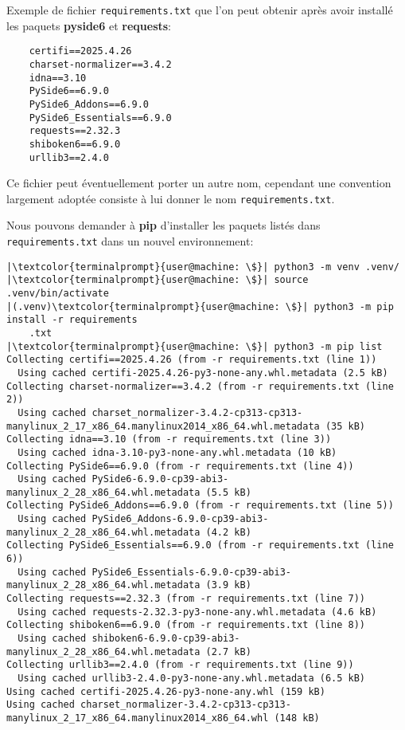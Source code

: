 Exemple de fichier \texttt{requirements.txt} que l'on peut obtenir après avoir installé les paquets \textbf{pyside6} et \textbf{requests}:
\begin{verbatim}
    certifi==2025.4.26
    charset-normalizer==3.4.2
    idna==3.10
    PySide6==6.9.0
    PySide6_Addons==6.9.0
    PySide6_Essentials==6.9.0
    requests==2.32.3
    shiboken6==6.9.0
    urllib3==2.4.0
\end{verbatim}

Ce fichier peut éventuellement porter un autre nom, cependant une convention largement adoptée consiste à lui donner le nom \texttt{requirements.txt}.

Nous pouvons demander à \textbf{pip} d’installer les paquets listés dans \texttt{requirements.txt} dans un nouvel environnement:
\begin{lstlisting}[style=terminal]
|\textcolor{terminalprompt}{user@machine: \$}| python3 -m venv .venv/
|\textcolor{terminalprompt}{user@machine: \$}| source .venv/bin/activate
|(.venv)\textcolor{terminalprompt}{user@machine: \$}| python3 -m pip install -r requirements
    .txt
|\textcolor{terminalprompt}{user@machine: \$}| python3 -m pip list
Collecting certifi==2025.4.26 (from -r requirements.txt (line 1))
  Using cached certifi-2025.4.26-py3-none-any.whl.metadata (2.5 kB)
Collecting charset-normalizer==3.4.2 (from -r requirements.txt (line 2))
  Using cached charset_normalizer-3.4.2-cp313-cp313-manylinux_2_17_x86_64.manylinux2014_x86_64.whl.metadata (35 kB)
Collecting idna==3.10 (from -r requirements.txt (line 3))
  Using cached idna-3.10-py3-none-any.whl.metadata (10 kB)
Collecting PySide6==6.9.0 (from -r requirements.txt (line 4))
  Using cached PySide6-6.9.0-cp39-abi3-manylinux_2_28_x86_64.whl.metadata (5.5 kB)
Collecting PySide6_Addons==6.9.0 (from -r requirements.txt (line 5))
  Using cached PySide6_Addons-6.9.0-cp39-abi3-manylinux_2_28_x86_64.whl.metadata (4.2 kB)
Collecting PySide6_Essentials==6.9.0 (from -r requirements.txt (line 6))
  Using cached PySide6_Essentials-6.9.0-cp39-abi3-manylinux_2_28_x86_64.whl.metadata (3.9 kB)
Collecting requests==2.32.3 (from -r requirements.txt (line 7))
  Using cached requests-2.32.3-py3-none-any.whl.metadata (4.6 kB)
Collecting shiboken6==6.9.0 (from -r requirements.txt (line 8))
  Using cached shiboken6-6.9.0-cp39-abi3-manylinux_2_28_x86_64.whl.metadata (2.7 kB)
Collecting urllib3==2.4.0 (from -r requirements.txt (line 9))
  Using cached urllib3-2.4.0-py3-none-any.whl.metadata (6.5 kB)
Using cached certifi-2025.4.26-py3-none-any.whl (159 kB)
Using cached charset_normalizer-3.4.2-cp313-cp313-manylinux_2_17_x86_64.manylinux2014_x86_64.whl (148 kB)

\end{lstlisting}
